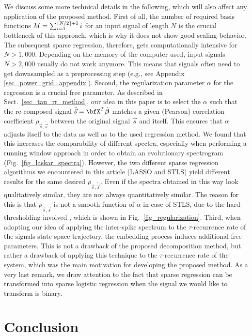 \documentclass[entropy,article,submit,pdftex,moreauthors]{Definitions/mdpi}
\DeclarePairedDelimiter\ceil{\lceil}{\rceil}
\begin{document}
We discuss some more technical details in the following, which will also affect any application of the proposed method. 
First of all, the number of required basis functions 
$M = \sum_{i=1}^{\ceil*{N/2}+1}i$ for an input signal of length $N$ is the crucial bottleneck of this approach, which is why it does not show good scaling behavior. The subsequent sparse 
regression, therefore, gets computationally intensive for $N>1,000$. Depending on the memory of the computer used, input signals $N>2,000$ usually do not work anymore. This means that signals 
often need to get downsampled as a preprocessing step (e.g., see Appendix \ref{sec_power_grid_appendix}). Second, the regularization parameter $\alpha$ for the regression is a crucial free parameter. 
As described in Sect.~\ref{sec_tau_rr_method}, our idea in this paper is to select the $\alpha$ such that the re-composed signal $\tilde{\vec{s}}=\bfX^T\hat{\boldsymbol\beta}$ matches a 
given (Pearson) correlation coefficient $\rho_{\vec{s},\tilde{\vec{s}}}$ between the original signal $\vec{s}$ and itself. This ensures that $\alpha$ adjusts itself to the data as well as to the 
used regression method. We found that this increases the comparability of different spectra, especially when performing a running window approach in order to obtain an evolutionary spectrogram 
(Fig.~\ref{fig_laskar_spectra}). 
However, the two different sparse regression algorithms we encountered in this article (LASSO and STLS) yield different results for the same desired $\rho_{\vec{s},\tilde{\vec{s}}}$. 
Even if the spectra obtained in this way look qualitatively similar, they are not always quantitatively similar. The reason for this 
is that $\rho_{\vec{s},\tilde{\vec{s}}}$ is not a smooth function of $\alpha$ in case of STLS, due to the hard-thresholding involved \cite{Brunton2016}, which is shown in Fig.~\ref{fig_regularization}.
Third, when adopting our idea of applying the inter-spike spectrum to the $\tau$-recurrence rate of the signals state space trajectory, the embedding process induces additional free parameters.  
This is not a drawback of the proposed decomposition method, but rather a drawback of applying this technique to the $\tau$-recurrence rate of the system, which was the main motivation for 
developing the proposed method. As a very last remark, we draw attention to the fact that sparse regression can be transformed into sparse logistic regression when the signal we would like to transform is binary.


\section{Conclusion}\label{sec_tau_rr_conclusion}
\end{document}
